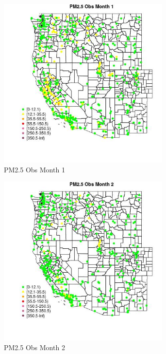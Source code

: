 \begin{figure} 
\centering  
\includegraphics[width=0.77\textwidth]{Code_Outputs/Report_ML_input_PM25_Step4_part_e_de_duplicated_aves_compiled_2019-05-18wNAs_MapObsMo1PM25_Obs.jpg} 
\caption{\label{fig:Report_ML_input_PM25_Step4_part_e_de_duplicated_aves_compiled_2019-05-18wNAsMapObsMo1PM25_Obs}PM2.5 Obs Month 1} 
\end{figure} 
 

\clearpage 

\begin{figure} 
\centering  
\includegraphics[width=0.77\textwidth]{Code_Outputs/Report_ML_input_PM25_Step4_part_e_de_duplicated_aves_compiled_2019-05-18wNAs_MapObsMo2PM25_Obs.jpg} 
\caption{\label{fig:Report_ML_input_PM25_Step4_part_e_de_duplicated_aves_compiled_2019-05-18wNAsMapObsMo2PM25_Obs}PM2.5 Obs Month 2} 
\end{figure} 
 

